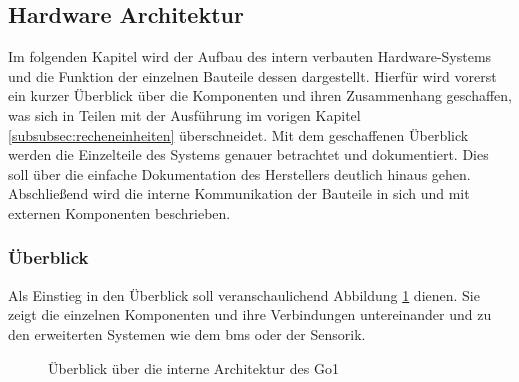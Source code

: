 \subsection{Hardware Architektur}
\label{subsec:hardware-architektur}

Im folgenden Kapitel wird der Aufbau des intern verbauten Hardware-Systems und die Funktion der einzelnen Bauteile
dessen dargestellt.
Hierfür wird vorerst ein kurzer Überblick über die Komponenten und ihren Zusammenhang geschaffen, was sich in Teilen
mit der Ausführung im vorigen Kapitel \ref{subsubsec:recheneinheiten} überschneidet.
Mit dem geschaffenen Überblick werden die Einzelteile des Systems genauer betrachtet und dokumentiert.
Dies soll über die einfache Dokumentation des Herstellers deutlich hinaus gehen.
Abschließend wird die interne Kommunikation der Bauteile in sich und mit externen Komponenten beschrieben.

\subsubsection{Überblick}
\label{subsubsec:ueberblick_hardware}

Als Einstieg in den Überblick soll veranschaulichend Abbildung \ref{fig:hardware_ueberblick} dienen.
Sie zeigt die einzelnen Komponenten und ihre Verbindungen untereinander und zu den erweiterten Systemen wie dem \gls{bms}
oder der Sensorik.

\begin{figure}[h]
    \caption{Überblick über die interne Architektur des Go1}\label{fig:hardware_ueberblick}
\end{figure}

